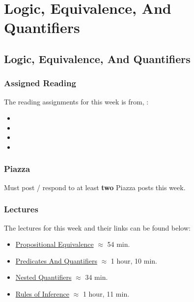 \clearpage

\renewcommand{\ChapTitle}{Logic, Equivalence, And Quantifiers}
\renewcommand{\SectionTitle}{Logic, Equivalence, And Quantifiers}

\chapter{\ChapTitle}
\section{\SectionTitle}

\subsection{Assigned Reading}

The reading assignments for this week is from, \Textbook:

\begin{itemize}
    \item {}
    \item {}
    \item {}
    \item {}
\end{itemize}

\subsection{Piazza}

Must post / respond to at least \textbf{two} Piazza posts this week.

\subsection{Lectures}

The lectures for this week and their links can be found below:

\begin{itemize}
    \item \href{https://applied.cs.colorado.edu/mod/hvp/view.php?id=51566}{Propositional Equivalence} $\approx$ 54 min.
    \item \href{https://applied.cs.colorado.edu/mod/hvp/view.php?id=51567}{Predicates And Quantifiers} $\approx$ 1 hour, 10 min.
    \item \href{https://applied.cs.colorado.edu/mod/hvp/view.php?id=51568}{Nested Quantifiers} $\approx$ 34 min.
    \item \href{https://applied.cs.colorado.edu/mod/hvp/view.php?id=51569}{Rules of Inference} $\approx$ 1 hour, 11 min.
\end{itemize}


